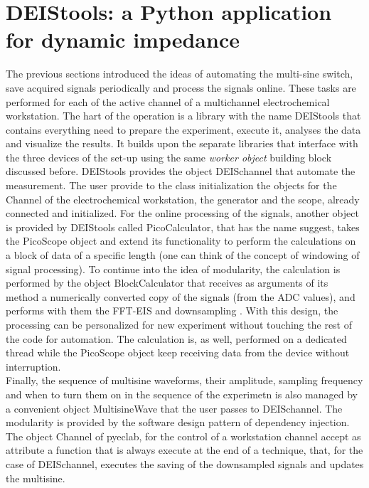 \section{DEIStools: a Python application for dynamic impedance}
The previous sections introduced the ideas of automating the multi-sine switch, save acquired signals periodically and process the signals online. These tasks are performed for each of the active channel of a multichannel electrochemical workstation. The hart of the operation is a library with the name DEIStools that contains everything need to prepare the experiment, execute it, analyses the data and visualize the results. It builds upon the separate libraries that interface with the three devices of the set-up using the same \emph{worker object} building block discussed before. DEIStools provides the object DEISchannel that automate the measurement. The user provide to the class initialization the objects for the Channel of the electrochemical workstation, the generator and the scope, already connected and initialized. For the online processing of the signals, another object is provided by DEIStools called PicoCalculator, that has the name suggest, takes the PicoScope object and extend its functionality to perform the calculations on a block of data of a specific length (one can think of the concept of windowing of signal processing). To continue into the idea of modularity, the calculation is performed by the object BlockCalculator that receives as arguments of its method a numerically converted copy of the signals (from the ADC values), and performs with them the FFT-EIS and downsampling . With this design, the processing can be personalized for new experiment without touching the rest of the code for automation. The calculation is, as well, performed on a dedicated thread while the PicoScope object keep receiving data from the device without interruption.\\
Finally, the sequence of multisine waveforms, their amplitude, sampling frequency and when to turn them on in the sequence of the experimetn is also managed by a convenient object MultisineWave that the user passes to DEISchannel.
The modularity is provided by the software design pattern of dependency injection. The object Channel of pyeclab, for the control of a workstation channel accept as attribute a function that is always execute at the end of a technique, that, for the case of DEISchannel, executes the saving of the downsampled signals and updates the multisine. \\
